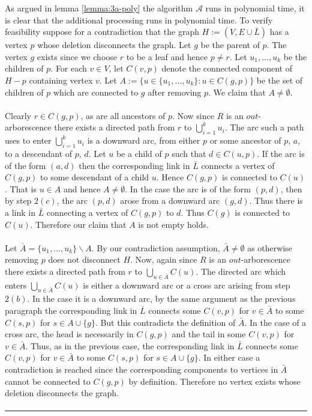 \documentclass[letterpaper,12pt,oneside,onecolumn]{article}
\newcommand{\cA}{\mathcal{A}} \newcommand{\cB}{\mathcal{B}}
\newenvironment{proof}{{\bf Proof:  }}{\hfill\rule{2mm}{2mm}}
\begin{document}
\begin{proof}
As argued in lemma \ref{lemma:3a-poly} the algorithm $\cA$ runs in polynomial time, it is clear that the additional processing runs in polynomial time. To verify feasibility suppose for a contradiction that the graph $H := (V, E \cup \bar{L})$ has a vertex $p$ whose deletion disconnects the graph. Let $g$ be the parent of $p$. The vertex $g$ exists since we choose $r$ to be a leaf and hence $p \neq r$. Let $u_1, \dots, u_k$ be the children of $p$. For each $v \in V$, let $C(v,p)$ denote the connected component of $H-p$ containing vertex $v$. Let $A := \{u \in \{u_1, \dots, u_k\} : u \in C(g,p)\}$ be the set of children of $p$ which are connected to $g$ after removing $p$. We claim that $A \neq \emptyset$.
\paragraph{}
Clearly $r \in C(g,p)$, as are all ancestors of $p$. Now since $R$ is an $out$-arborescence there exists a directed path from $r$ to $\bigcup_{i=1}^k u_i$. The arc such a path uses to enter $\bigcup_{i=1}^k u_i$ is a downward arc, from either $p$ or  some ancestor of $p$, $a$, to a descendant of $p$, $d$. Let $u$ be a child of $p$ such that $d \in C(u,p)$. If the arc is of the form $(a,d)$ then the corresponding link  in $\bar{L}$ connects a vertex of $C(g,p)$ to some descendant of a child $u$. Hence $C(g,p)$ is connected to $C(u)$. That is $u \in A$ and hence $A \neq \emptyset$. In the case the arc is of the form $(p,d)$, then by step $2(c)$, the arc $(p,d)$ arose from a downward arc $(g,d)$. Thus there is a link in $\bar{L}$ connecting a vertex of $C(g,p)$ to $d$. Thus $C(g)$ is connected to $C(u)$. Therefore our claim that $A$ is not empty holds.
\paragraph{}
 Let $\bar{A} = \{u_1, \dots, u_k\} \backslash A$. By our contradiction assumption, $\bar{A}\neq \emptyset$ as otherwise removing $p$ does not disconnect $H$. Now, again since $R$ is an $out$-arborescence there exists a directed path from $r$ to $\bigcup_{u \in \bar{A}} C(u)$. The directed arc which enters $\bigcup_{u \in \bar{A}} C(u)$ is either a downward arc or a cross arc arising from step $2(b)$. In the case it is a downward arc, by the same argument as the previous paragraph the corresponding link in $\bar{L}$ connects some $C(v, p)$ for $v \in \bar{A}$ to some $C(s,p)$ for $s \in A \cup \{g\}$. But this contradicts the definition of $\bar{A}$. In the case of a cross arc, the head is necessarily in $C(g,p)$ and the tail in some $C(v,p)$ for $v \in \bar{A}$. Thus, as in the previous case, the corresponding link in $\bar{L}$ connects some $C(v, p)$ for $v \in \bar{A}$ to some $C(s,p)$ for $s \in A \cup \{g\}$. In either case a contradiction is reached since the corresponding components to vertices in $\bar{A}$ cannot be connected to $C(g,p)$ by definition. Therefore no vertex exists whose deletion disconnects the graph.
\paragraph{} 
\end{proof}
\section{}
\end{document}
